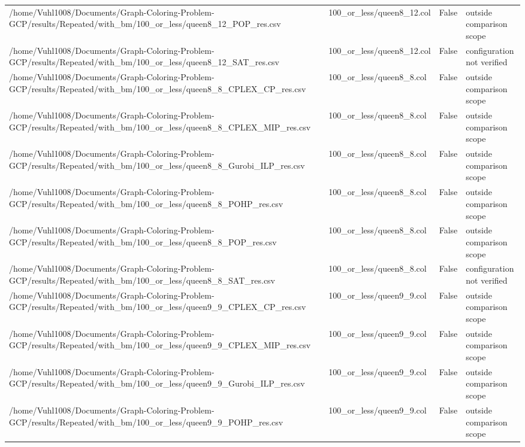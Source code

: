 \begin{table}[htbp]
\begin{tabular}{llll}
/home/Vuhl1008/Documents/Graph-Coloring-Problem-GCP/results/Repeated/with\_bm/100\_or\_less/queen8\_12\_POP\_res.csv & 100\_or\_less/queen8\_12.col & False & outside comparison scope \\
/home/Vuhl1008/Documents/Graph-Coloring-Problem-GCP/results/Repeated/with\_bm/100\_or\_less/queen8\_12\_SAT\_res.csv & 100\_or\_less/queen8\_12.col & False & configuration not verified \\
/home/Vuhl1008/Documents/Graph-Coloring-Problem-GCP/results/Repeated/with\_bm/100\_or\_less/queen8\_8\_CPLEX\_CP\_res.csv & 100\_or\_less/queen8\_8.col & False & outside comparison scope \\
/home/Vuhl1008/Documents/Graph-Coloring-Problem-GCP/results/Repeated/with\_bm/100\_or\_less/queen8\_8\_CPLEX\_MIP\_res.csv & 100\_or\_less/queen8\_8.col & False & outside comparison scope \\
/home/Vuhl1008/Documents/Graph-Coloring-Problem-GCP/results/Repeated/with\_bm/100\_or\_less/queen8\_8\_Gurobi\_ILP\_res.csv & 100\_or\_less/queen8\_8.col & False & outside comparison scope \\
/home/Vuhl1008/Documents/Graph-Coloring-Problem-GCP/results/Repeated/with\_bm/100\_or\_less/queen8\_8\_POHP\_res.csv & 100\_or\_less/queen8\_8.col & False & outside comparison scope \\
/home/Vuhl1008/Documents/Graph-Coloring-Problem-GCP/results/Repeated/with\_bm/100\_or\_less/queen8\_8\_POP\_res.csv & 100\_or\_less/queen8\_8.col & False & outside comparison scope \\
/home/Vuhl1008/Documents/Graph-Coloring-Problem-GCP/results/Repeated/with\_bm/100\_or\_less/queen8\_8\_SAT\_res.csv & 100\_or\_less/queen8\_8.col & False & configuration not verified \\
/home/Vuhl1008/Documents/Graph-Coloring-Problem-GCP/results/Repeated/with\_bm/100\_or\_less/queen9\_9\_CPLEX\_CP\_res.csv & 100\_or\_less/queen9\_9.col & False & outside comparison scope \\
/home/Vuhl1008/Documents/Graph-Coloring-Problem-GCP/results/Repeated/with\_bm/100\_or\_less/queen9\_9\_CPLEX\_MIP\_res.csv & 100\_or\_less/queen9\_9.col & False & outside comparison scope \\
/home/Vuhl1008/Documents/Graph-Coloring-Problem-GCP/results/Repeated/with\_bm/100\_or\_less/queen9\_9\_Gurobi\_ILP\_res.csv & 100\_or\_less/queen9\_9.col & False & outside comparison scope \\
/home/Vuhl1008/Documents/Graph-Coloring-Problem-GCP/results/Repeated/with\_bm/100\_or\_less/queen9\_9\_POHP\_res.csv & 100\_or\_less/queen9\_9.col & False & outside comparison scope \\

\end{tabular}
\end{table}
